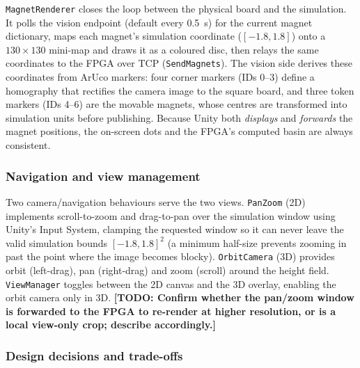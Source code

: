 \documentclass[11pt,a4paper]{article}
\newcommand{\todo}[1]{\textcolor{red!75!black}{\textbf{[TODO: #1]}}}
\begin{document}
\texttt{MagnetRenderer} closes the loop between the physical board and the
simulation. It polls the vision endpoint (default every \SI{0.5}{s}) for the
current magnet dictionary, maps each magnet's simulation coordinate
($[-1.8,1.8]$) onto a $130\times130$ mini-map and draws it as a coloured disc,
then relays the same coordinates to the FPGA over TCP
(\texttt{SendMagnets}). The vision side derives these coordinates from ArUco
markers: four corner markers (IDs 0--3) define a homography that rectifies the
camera image to the square board, and three token markers (IDs 4--6) are the
movable magnets, whose centres are transformed into simulation units before
publishing. Because Unity both \emph{displays} and \emph{forwards} the magnet
positions, the on-screen dots and the FPGA's computed basin are always
consistent.

\subsubsection{Navigation and view management}

Two camera/navigation behaviours serve the two views. \texttt{PanZoom} (2D)
implements scroll-to-zoom and drag-to-pan over the simulation window using
Unity's Input System, clamping the requested window so it can never leave the
valid simulation bounds $[-1.8,1.8]^2$ (a minimum half-size prevents zooming in
past the point where the image becomes blocky). \texttt{OrbitCamera} (3D)
provides orbit (left-drag), pan (right-drag) and zoom (scroll) around the height
field. \texttt{ViewManager} toggles between the 2D canvas and the 3D overlay,
enabling the orbit camera only in 3D. \todo{Confirm whether the pan/zoom window
is forwarded to the FPGA to re-render at higher resolution, or is a local
view-only crop; describe accordingly.}

\subsubsection{Design decisions and trade-offs}
\label{sec:tradeoffs}
\end{document}
